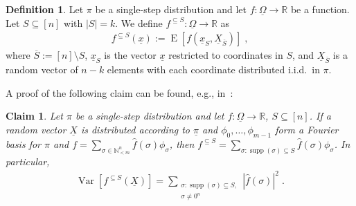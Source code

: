 \documentclass{daj}
\newcommand{\1}{\mathbbm{1}}
\theoremstyle{plain}
\newtheorem{claim}[theorem]{Claim}
\theoremstyle{definition}
\newtheorem{definition}[theorem]{Definition}
\DeclareMathOperator*{\EE}{E}
\DeclareMathOperator*{\supp}{supp}
\DeclareMathOperator*{\Var}{Var}
\newcommand{\bbR}{\mathbb{R}}
\begin{document}
\begin{definition}
Let $\pi$ be a single-step distribution and let 
$f: \underline{\Omega} \to \bbR$ be a 
function. Let $S \subseteq [n]$ with $|S| = k$.
We define $f^{\subseteq S}: \underline{\Omega} \to \bbR$ as
\begin{align}
f^{\subseteq S}(\underline{x}) :=
\EE[f(\underline{x}_S,\underline{X}_{\overline S})] \; ,
\end{align}
where $\overline S := [n] \setminus S$, $\underline{x}_{S}$
is the vector $\underline{x}$ restricted to coordinates in $S$,
and $\underline{X}_{\overline{S}}$ is a random vector of
$n-k$ elements with each coordinate distributed i.i.d.~in $\pi$.
\end{definition}

A proof of the following claim can be found, e.g., in~\cite{Dol14}:
\begin{claim}
\label{cl:fourier-vs-variance}
Let $\pi$ be a single-step distribution and let 
$f: \underline{\Omega} \to \bbR$, $S \subseteq [n]$.
If a random vector $\underline{X}$ 
is distributed according to $\underline{\pi}$
and $\phi_0, \ldots, \phi_{m-1}$ form a Fourier basis for $\pi$ and
$f = \sum_{\sigma \in \mathbb{N}^n_{< m}} 
\hat{f}(\sigma) \phi_{\sigma}$, then
$f^{\subseteq S} = \sum_{\sigma: \supp(\sigma) \subseteq S}
\hat{f}(\sigma) \phi_{\sigma}$.
In particular,
\begin{align*}
\Var\left[f^{\subseteq S}(\underline{X})\right] = 
\sum_{\substack{\sigma: \supp(\sigma) \subseteq S,\\ 
\sigma \ne 0^n}} 
\left|\hat{f}(\sigma)\right|^2 \; .
\end{align*}
\end{claim}
\end{document}
